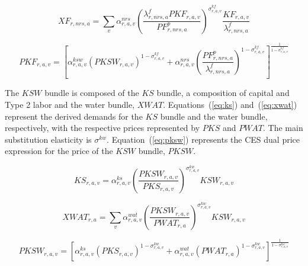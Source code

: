 \documentclass[11pt,letterpaper]{report}
\begin{document}
\begin{equation}
\label{eq:xnrs}
\mathit{XF}_{\mathit{r,nrs,a}} =
   \sum_v{
      \alpha^{\mathit{nrs}}_{\mathit{r,a,v}}
      \left( \frac {\lambda^f_{r,\mathit{nrs},a} \mathit{PKF}_{r,a,v}}
         {\mathit{PF}^p_{r,\mathit{nrs},a}}
      \right)^{\sigma^{\mathit{kf}}_{\mathit{r,a,v}}}
      \frac {\mathit{KF}_{r,a,v}} {\lambda^f_{r,\mathit{nrs},a}}
   }
\end{equation}

\begin{equation}
\label{eq:pkf}
\mathit{PKF}_{r,a,v} =
   \left[
      \alpha^{\mathit{ksw}}_{\mathit{r,a,v}}
      \left( \mathit{PKSW}_{r,a,v}
      \right)^{1 - \sigma^{\mathit{kf}}_{\mathit{r,a,v}}}
   +  \alpha^{\mathit{nrs}}_{\mathit{r,a,v}}
      \left( \frac {\mathit{PF}^p_{r,\mathit{nrs},a}}
         {\lambda^f_{r,\mathit{nrs},a}}
      \right)^{1 - \sigma^{\mathit{kf}}_{\mathit{r,a,v}}}
   \right]^{\frac{1} {1 - \sigma^{\mathit{kf}}_{\mathit{r,a,v}}}}
\end{equation}

The $\mathit{KSW}$ bundle is composed of the $\mathit{KS}$ bundle, a composition
of capital and Type 2 labor and the water bundle, $\mathit{XWAT}$.
Equations~(\ref{eq:ks}) and~(\ref{eq:xwat}) represent the derived demands for
the $\mathit{KS}$ bundle and the water bundle, respectively, with the respective
prices represented by $\mathit{PKS}$ and $\mathit{PWAT}$. The main substitution
elasticity is $\sigma^{\mathit{kw}}$. Equation~(\ref{eq:pksw}) represents the
CES dual price expression for the price of the $\mathit{KSW}$ bundle,
$\mathit{PKSW}$.

\begin{equation}
\label{eq:ks}
\mathit{KS}_{r,a,v} =
   \alpha^{\mathit{ks}}_{\mathit{r,a,v}}
   \left( \frac {\mathit{PKSW}_{r,a,v}} {\mathit{PKS}_{r,a,v}}
   \right)^{\sigma^{\mathit{kw}}_{\mathit{r,a,v}}}
   \mathit{KSW}_{r,a,v}
\end{equation}

\begin{equation}
\label{eq:xwat}
\mathit{XWAT}_{r,a} =
   \sum_v{
      \alpha^{\mathit{wat}}_{\mathit{r,a,v}}
      \left( \frac {\mathit{PKSW}_{r,a,v}} {\mathit{PWAT}_{r,a}}
      \right)^{\sigma^{\mathit{kw}}_{\mathit{r,a,v}}}
      \mathit{KSW}_{r,a,v}
   }
\end{equation}

\begin{equation}
\label{eq:pksw}
\mathit{PKSW}_{r,a,v} =
   \left[
      \alpha^{\mathit{ks}}_{\mathit{r,a,v}}
      \left( \mathit{PKS}_{r,a,v}
      \right)^{1 - \sigma^{\mathit{kw}}_{\mathit{r,a,v}}}
   +  \alpha^{\mathit{wat}}_{\mathit{r,a,v}}
      \left( {\mathit{PWAT}_{r,a}}
      \right)^{1 - \sigma^{\mathit{kw}}_{\mathit{r,a,v}}}
   \right]^{\frac{1} {1 - \sigma^{\mathit{kw}}_{\mathit{r,a,v}}}}
\end{equation}
\end{document}
